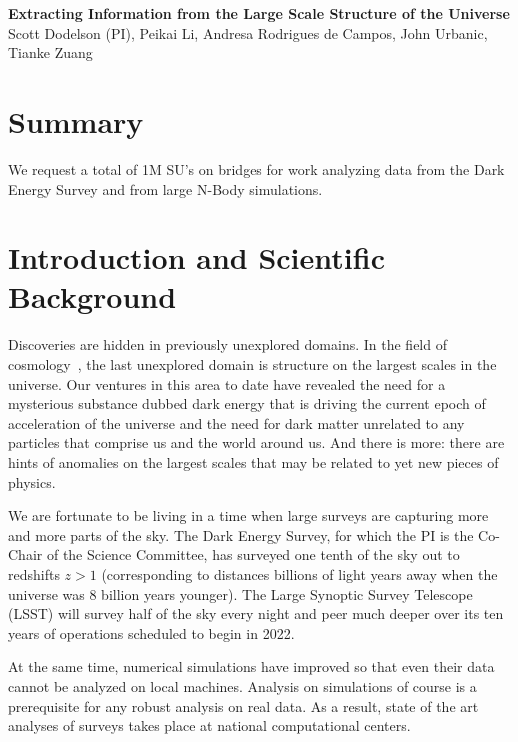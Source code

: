 \documentclass[12pt]{article}
\begin{document}
\topmargin=-2.105cm
\oddsidemargin=-0.1cm
\evensidemargin=0cm

\begin{center}
{\bf Extracting Information from the Large Scale Structure of the Universe\\}
Scott Dodelson (PI), Peikai Li, Andresa Rodrigues de Campos, John Urbanic, Tianke Zuang
\end{center}

\begin{small}


\section*{Summary} We request a total of 1M SU's on bridges for work analyzing data from the Dark Energy Survey and from large N-Body simulations.

\section{Introduction and Scientific Background}

Discoveries are hidden in previously unexplored domains. In the field of cosmology~\cite{Dodelson:2003ft}, the last unexplored domain is structure on the largest scales in the universe. Our ventures in this area to date have revealed the need for a mysterious substance dubbed dark energy that is driving the current epoch of acceleration of the universe and the need for dark matter unrelated to any particles that comprise us and the world around us. And there is more: there are hints of anomalies on the largest scales that may be related to yet new pieces of physics. 

We are fortunate to be living in a time when large surveys are capturing more and more parts of the sky. The Dark Energy Survey, for which the PI is the Co-Chair of the Science Committee, has surveyed one tenth of the sky out to redshifts $z>1$ (corresponding to distances billions of light years away when the universe was 8 billion years younger). The Large Synoptic Survey Telescope (LSST) will survey half of the sky every night and peer much deeper over its ten years of operations scheduled to begin in 2022. 

At the same time, numerical simulations have improved so that even their data cannot be analyzed on local machines. Analysis on simulations of course is a prerequisite for any robust analysis on real data. As a result, state of the art analyses of surveys takes place at national computational centers.


\end{small}
\end{document}
